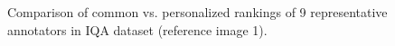 \documentclass[10pt,journal,cspaper,compsoc]{IEEEtran}
\begin{document}
{\begin{figure}
 \begin{center}
  \caption{Comparison of common vs. personalized rankings of 9 representative annotators in IQA dataset (reference image 1).}  \label{iqa_position_color}
\end{center}
\end{figure}


}
\end{document}
